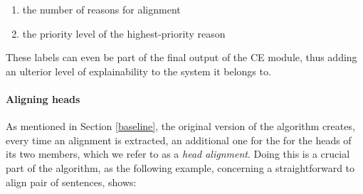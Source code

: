 \begin{enumerate}
 \item the number of reasons for alignment
 \item the priority level of the highest-priority reason
\end{enumerate} \smallskip

These labels can even be part of the final output of the CE module, thus adding an ulterior level of explainability to the system it belongs to.

\paragraph{Aligning heads} \label{heads}
As mentioned in Section \ref{baseline}, the original version of the algorithm creates, every time an alignment is extracted, an additional one for the for the heads of its two members, which we refer to as a \textit{head alignment}. Doing this is a crucial part of the algorithm, as the following example, concerning a straightforward to align pair of sentences, shows: \smallskip
